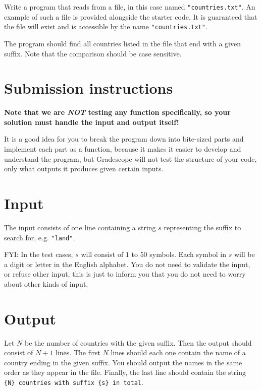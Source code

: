 
Write a program that reads from a file, in this case named \texttt{"countries.txt"}.
An example of such a file is provided alongside the starter code.
It is guaranteed that the file will exist and is accessible by the name \texttt{"countries.txt"}.

The program should find all countries listed in the file that end with a given suffix.
Note that the comparison should be case sensitive.

\section*{Submission instructions}

\textbf{Note that we are \emph{NOT} testing any function specifically,
so your solution must handle the input and output itself!}

It is a good idea for you to break the program down into bite-sized parts
and implement each part as a function,
because it makes it easier to develop and understand the program,
but Gradescope will not test the structure of your code,
only what outputs it produces given certain inputs.

\section*{Input}
The input consists of one line containing a string $s$
representing the suffix to search for,
e.g. \texttt{"land"}.

FYI: In the test cases,
$s$ will consist of $1$ to $50$ symbols.
Each symbol in $s$ will be a digit or letter in the English alphabet.
You do not need to validate the input, or refuse other input,
this is just to inform you that you do not need to worry about other kinds of input.

\section*{Output}


Let $N$ be the number of countries with the given suffix.
Then the output should consist of $N+1$ lines.
The first $N$ lines should each one contain the name of a country ending in the given suffix.
You should output the names in the same order as they appear in the file.
Finally, the last line should contain the string\\
\texttt{\{N\} countries with suffix \{s\} in total}.
